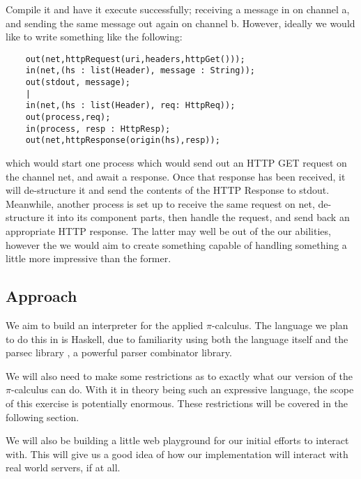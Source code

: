 Compile it and have it execute successfully; receiving a message in on channel a, and sending the same message out again on channel b. However, ideally we would like to write something like the following:
\begin{verbatim}
    out(net,httpRequest(uri,headers,httpGet()));
    in(net,(hs : list(Header), message : String));
    out(stdout, message);
    |
    in(net,(hs : list(Header), req: HttpReq));
    out(process,req);
    in(process, resp : HttpResp);
    out(net,httpResponse(origin(hs),resp));
\end{verbatim}

which would start one process which would send out an HTTP GET request on the channel net, and await a response. Once that response has been received, it will de-structure it and send the contents of the HTTP Response to stdout. Meanwhile, another process is set up to receive the same request on net, de-structure it into its component parts, then handle the request, and send back an appropriate HTTP response. The latter may well be out of the our abilities, however the we would aim to create something capable of handling something a little more impressive than the former.

\subsection{Approach}

We aim to build an interpreter for the applied $\pi$-calculus. The language we plan to do this in is Haskell, due to familiarity using both the language itself and the parsec library \cite{lm01}, a powerful parser combinator library. 

We will also need to make some restrictions as to exactly what our version of the $\pi$-calculus can do. With it in theory being such an expressive language, the scope of this exercise is potentially enormous. These restrictions will be covered in the following section.

We will also be building a little web playground for our initial efforts to interact with. This will give us a good idea of how our implementation will interact with real world servers, if at all. 



